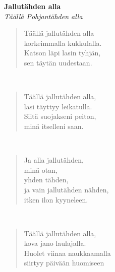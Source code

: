 %
%
\noindent\begin{minipage}{\linewidth}
\vspace{5pt}
\parbox[t]{0.85\linewidth}{\raggedright {\large\bf Jallutähden alla}\\[2pt]\small\emph{Täällä Pohjantähden alla}\\[6pt]}
\begin{verse}
	
	Täällä jallutähden alla\\
	korkeimmalla kukkulalla.\\
	Katson läpi lasin tyhjän,\\
	sen täytän uudestaan.\\
\end{verse}
\end{minipage}\\[10pt]
\noindent\begin{minipage}{\linewidth}
\begin{verse}
	Täällä jallutähden alla,\\
	lasi täyttyy leikatulla.\\
	Siitä suojakseni peiton,\\
	minä itselleni saan.\\
\end{verse}
\end{minipage}\\[10pt]
\noindent\begin{minipage}{\linewidth}
\begin{verse}
	Ja alla jallutähden,\\
	minä otan,\\
	yhden tähden,\\
	ja vain jallutähden nähden,\\
	itken ilon kyyneleen.\\
\end{verse}
\end{minipage}\\[10pt]
\noindent\begin{minipage}{\linewidth}
\begin{verse}
	Täällä jallutähden alla,\\
	kova jano laulajalla.\\
	Huolet viinaa naukkaamalla\\
	siirtyy päivään huomiseen\\
\end{verse}
\end{minipage}\\[10pt]
